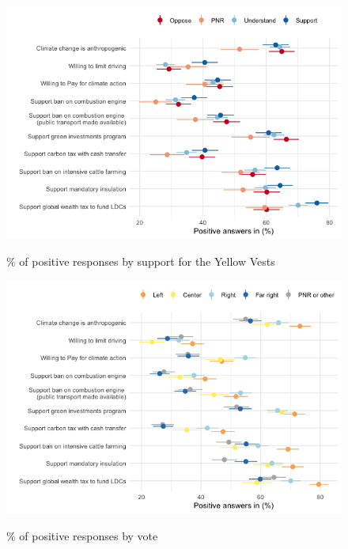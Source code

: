 	\begin{frame}{}%
	\begin{figure}[h!]
	\caption{\% of positive responses by support for the Yellow Vests}
	\includegraphics[width=.7\paperwidth]{../figures/FR/positive_all_by_yellow_vests_FR.png} \\
	\end{figure}
	\end{frame}
	
	\begin{frame}{}%
	\begin{figure}[h!]
	\caption{\% of positive responses by vote}
	\includegraphics[width=.7\paperwidth]{../figures/FR/positive_all_by_vote_agg_FR.png} \\
	\end{figure}
	\end{frame}
	
